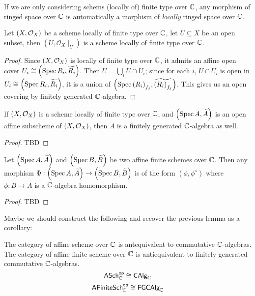 \begin{remark}
  If we are only considering schems (locally of) finite type over $\mathbb{C}$, any morphism of ringed space over $\mathbb{C}$ is automatically a morphism of {\em locally\/} ringed space over $\mathbb{C}$.

\end{remark}

\begin{proposition}
  Let $\left(X, \mathcal{O}_{X}\right)$ be a scheme locally of finite type over $\mathbb{C}$, let $U \subseteq X$ be an open subset, then $(U, \mathcal{O}_{X}\mid_{U})$ is a scheme locally of finite type over $\mathbb{C}$.
  \label{thm:restriction-of-scheme-of-finite-type-is-scheme-of-finite-type}
\end{proposition}
\begin{proof}
  Since $\left(X, \mathcal{O}_{X}\right)$ is locally of finite type over $\mathbb{C}$, it admits an affine open cover $U_{i}\cong\left(\operatorname*{Spec}{R_{i}}, \widetilde{R_{i}}\right)$.
  Then $U = \bigcup_{i} U \cap U_{i}$; since for each $i$, $U \cap U_{i}$ is open in $U_{i} \cong \left(\operatorname*{Spec}{R_{i}}, \widetilde{R_{i}}\right)$, it is a union of $\left(\operatorname*{Spec}{{\left(R_{i}\right)}_{f_{j}}}, \widetilde{{\left(R_{i}\right)}_{f_{j}}}\right)$. This gives us an open covering by finitely generated $\mathbb{C}$-algebra.
\end{proof}

\begin{proposition}
  If $\left(X, \mathcal{O}_{X}\right)$ is a scheme locally of finite type over $\mathbb{C}$, and $\left(\operatorname*{Spec}{A}, \widetilde{A}\right)$ is an open affine subscheme of $\left(X, \mathcal{O}_{X}\right)$, then $A$ is a finitely generated $\mathbb{C}$-algebra as well.
\end{proposition}

\begin{proof}
  TBD %
\end{proof}

\begin{proposition}
  Let $\left(\operatorname*{Spec}{A}, \widetilde{A}\right)$ and $\left(\operatorname*{Spec}{B}, \widetilde{B}\right)$ be two affine finite schemes over $\mathbb{C}$. Then any morphism $\Phi : \left(\operatorname*{Spec}{A}, \widetilde{A}\right) \to \left(\operatorname*{Spec}{B}, \widetilde{B}\right)$ is of the form $(\phi, \phi^{\star})$ where $\phi : B \to A$ is a $\mathbb{C}$-algebra homomorphism.
\end{proposition}

\begin{proof}
  TBD %
\end{proof}

Maybe we should construct the following and recover the previous lemma as a corollary:
\begin{proposition}
  The category of affine scheme over $\mathbb{C}$ is antequivalent to commutative $\mathbb{C}$-algebras.
  The category of affine finite scheme over $\mathbb{C}$ is antiequivalent to finitely generated commutative $\mathbb{C}$-algebras.
  \[
    \mathsf{ASch}_{\mathbb{C}}^{\mathsf{op}}\cong \mathsf{CAlg}_{\mathbb{C}}
  \]
  \[
    \mathsf{AFiniteSch}_{\mathbb{C}}^{\mathsf{op}}\cong \mathsf{FGCAlg}_{\mathbb{C}}
  \]
\end{proposition}


